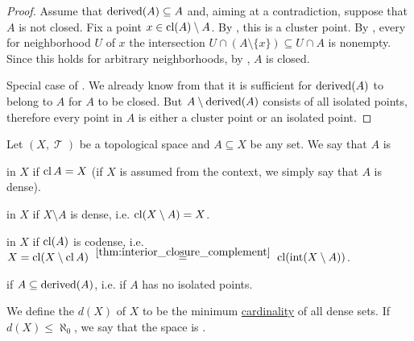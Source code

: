 \begin{proof}
   Assume that \( \operatorname{derived}(A) \subseteq A \) and, aiming at a contradiction, suppose that \( A \) is not closed. Fix a point \( x \in \operatorname{cl}(A) \setminus A \). By , this is a cluster point. By , every for neighborhood \( U \) of \( x \) the intersection \( U \cap (A \setminus \{ x \}) \subseteq U \cap A \) is nonempty. Since this holds for arbitrary neighborhoods, by , \( A \) is closed.

  Special case of .
   We already know from  that it is sufficient for \( \operatorname{derived}(A) \) to belong to \( A \) for \( A \) to be closed. But \( A \setminus \operatorname{derived}(A) \) consists of all isolated points, therefore every point in \( A \) is either a cluster point or an isolated point.
\end{proof}

\begin{definition}\label{def:topologically_dense_set}
  Let \( (X, \mscrT) \) be a topological space and \( A \subseteq X \) be any set. We say that \( A \) is

  \begin{thmenum}
      in \( X \) if \( \operatorname{cl}{A} = X \) (if \( X \) is assumed from the context, we simply say that \( A \) is dense).

      in \( X \) if \( X \setminus A \) is dense, i.e. \( \operatorname{cl}(X \setminus A) = X \).

      in \( X \) if \( \operatorname{cl}(A) \) is codense, i.e. \( X = \cl(X \setminus \cl A) \reloset {\ref{thm:interior_closure_complement}} = \cl(\Int(X \setminus A)) \).

      if \( A \subseteq \operatorname{derived}(A) \), i.e. if \( A \) has no isolated points.
  \end{thmenum}

  We define the  \( d(X) \) of \( X \) to be the minimum \hyperref[def:cardinal]{cardinality} of all dense sets. If \( d(X) \leq \aleph_0 \), we say that the space is .
\end{definition}

